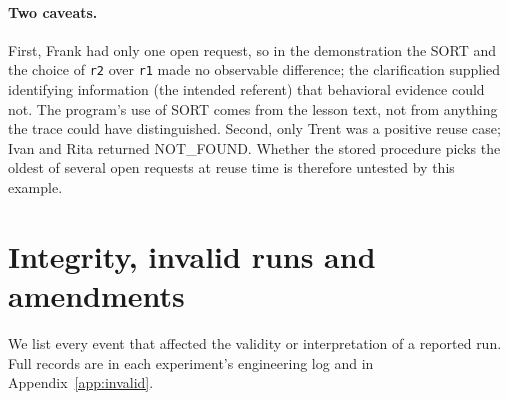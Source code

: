 \documentclass[10pt]{article}
\newcommand{\id}[1]{\nolinkurl{#1}}
\begin{document}
\paragraph{Two caveats.} First, Frank had only one open request, so in the demonstration the SORT and the choice of \id{r2} over \id{r1} made no observable difference; the clarification supplied identifying information (the intended referent) that behavioral evidence could not. The program's use of SORT comes from the lesson text, not from anything the trace could have distinguished. Second, only Trent was a positive reuse case; Ivan and Rita returned NOT\_FOUND. Whether the stored procedure picks the oldest of several open requests at reuse time is therefore untested by this example.

\section{Integrity, invalid runs and amendments}\label{sec:integrity}

We list every event that affected the validity or interpretation of a reported run. Full records are in each experiment's engineering log and in Appendix~\ref{app:invalid}.
\end{document}
